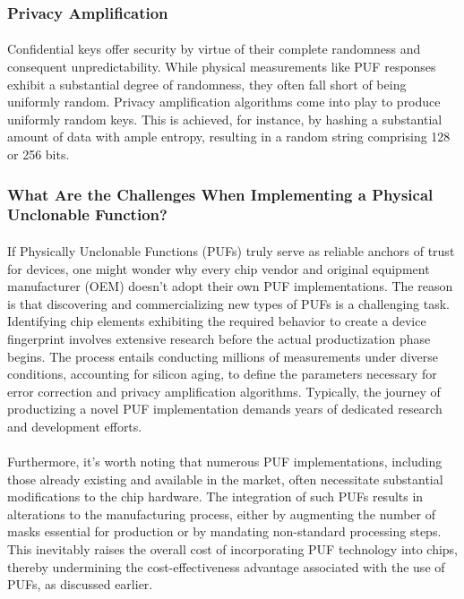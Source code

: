 \subsubsection{Privacy Amplification}
\paragraph*{}
Confidential keys offer security by virtue of their complete randomness and consequent unpredictability. While physical measurements like PUF responses exhibit a substantial degree of randomness, they often fall short of being uniformly random. Privacy amplification algorithms come into play to produce uniformly random keys. This is achieved, for instance, by hashing a substantial amount of data with ample entropy, resulting in a random string comprising 128 or 256 bits.
\subsubsection{What Are the Challenges When Implementing a Physical Unclonable Function?}
\paragraph*{}
If Physically Unclonable Functions (PUFs) truly serve as reliable anchors of trust for devices, one might wonder why every chip vendor and original equipment manufacturer (OEM) doesn't adopt their own PUF implementations. The reason is that discovering and commercializing new types of PUFs is a challenging task. Identifying chip elements exhibiting the required behavior to create a device fingerprint involves extensive research before the actual productization phase begins. The process entails conducting millions of measurements under diverse conditions, accounting for silicon aging, to define the parameters necessary for error correction and privacy amplification algorithms. Typically, the journey of productizing a novel PUF implementation demands years of dedicated research and development efforts.
\paragraph*{}
Furthermore, it's worth noting that numerous PUF implementations, including those already existing and available in the market, often necessitate substantial modifications to the chip hardware. The integration of such PUFs results in alterations to the manufacturing process, either by augmenting the number of masks essential for production or by mandating non-standard processing steps. This inevitably raises the overall cost of incorporating PUF technology into chips, thereby undermining the cost-effectiveness advantage associated with the use of PUFs, as discussed earlier.
